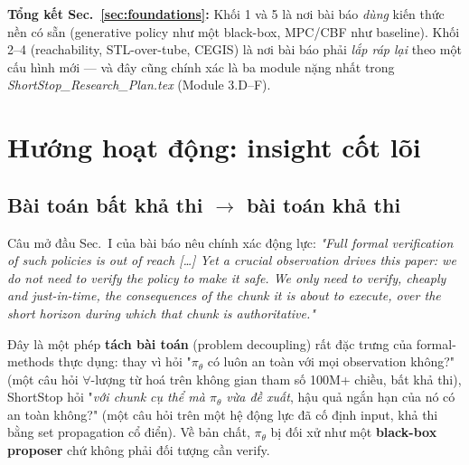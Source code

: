\documentclass[a4paper,12pt]{article}
\let\stdsection\section
\renewcommand{\section}{\clearpage\stdsection}
\begin{document}
\medskip
\noindent\textbf{Tổng kết Sec.~\ref{sec:foundations}:} Khối 1 và 5 là nơi bài báo \emph{dùng} kiến thức nền có sẵn (generative policy như một black-box, MPC/CBF như baseline). Khối 2--4 (reachability, STL-over-tube, CEGIS) là nơi bài báo phải \emph{lắp ráp lại} theo một cấu hình mới --- và đây cũng chính xác là ba module nặng nhất trong \emph{ShortStop\_Research\_Plan.tex} (Module 3.D--F).

\section{Hướng hoạt động: insight cốt lõi}\label{sec:direction}
\subsection{Bài toán bất khả thi $\to$ bài toán khả thi}
Câu mở đầu Sec.~I của bài báo nêu chính xác động lực: \emph{"Full formal verification of such policies is out of reach [\ldots] Yet a crucial observation drives this paper: we do not need to verify the policy to make it safe. We only need to verify, cheaply and just-in-time, the consequences of the chunk it is about to execute, over the short horizon during which that chunk is authoritative."}

Đây là một phép \textbf{tách bài toán} (problem decoupling) rất đặc trưng của formal-methods thực dụng: thay vì hỏi "$\pi_\theta$ có luôn an toàn với mọi observation không?" (một câu hỏi $\forall$-lượng từ hoá trên không gian tham số 100M+ chiều, bất khả thi), ShortStop hỏi "\emph{với chunk cụ thể mà $\pi_\theta$ vừa đề xuất}, hậu quả ngắn hạn của nó có an toàn không?" (một câu hỏi trên một hệ động lực đã cố định input, khả thi bằng set propagation cổ điển). Về bản chất, $\pi_\theta$ bị đối xử như một \textbf{black-box proposer} chứ không phải đối tượng cần verify.
\end{document}
